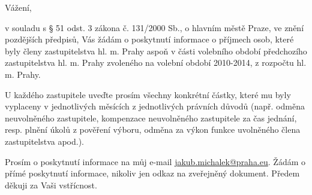 \documentclass[11pt,a4paper,czech]{article}
\begin{document}

\def \yoursign { }
\def \yourdate { }
\def \oursign {ZK Pha 6/2014}
\def \place {Praha}

\printheader

\subject{Žádost zastupitele hl. m. Prahy o informace}

Vážení,

v souladu s § 51 odst. 3 zákona č. 131/2000 Sb., o hlavním městě Praze, ve znění pozdějších předpisů, Vás žádám o poskytnutí informace o příjmech osob, které byly členy zastupitelstva hl. m. Prahy aspoň v části volebního období předchozího zastupitelstva hl. m. Prahy zvoleného na volební období 2010-2014, z rozpočtu hl. m. Prahy. 

U každého zastupitele uveďte prosím všechny konkrétní částky, které mu byly vyplaceny v jednotlivých měsících z jednotlivých právních důvodů (např. odměna neuvolněného zastupitele, kompenzace neuvolněného zastupitele za čas jednání, resp. plnění úkolů z pověření výboru, odměna za výkon funkce uvolněného člena zastupitelstva apod.).

Prosím o poskytnutí informace na můj e-mail \url{jakub.michalek@praha.eu}. Žádám o přímé poskytnutí informace, nikoliv jen odkaz na zveřejněný dokument. Předem děkuji za Vaši vstřícnost.

\signature{Mgr. Bc. Jakub Michálek \\ předseda klubu Pirátů \\ zastupitelstvo hl. m. Prahy}

\end{document}
